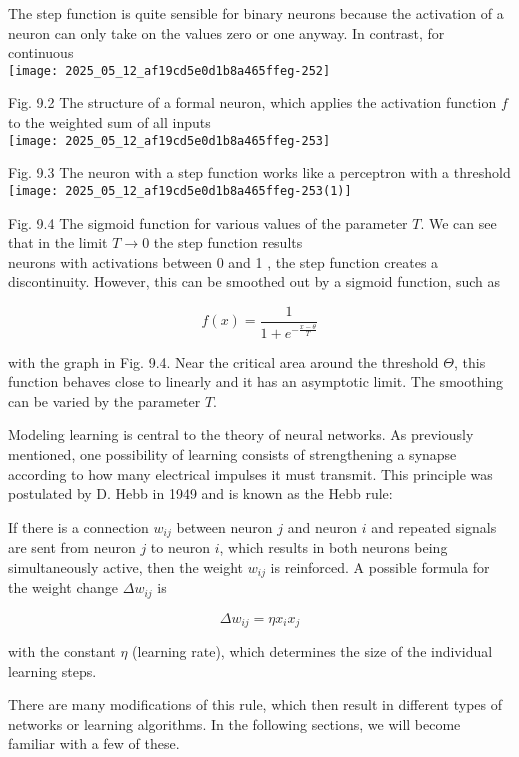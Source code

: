 \documentclass[10pt]{article}
\begin{document}
The step function is quite sensible for binary neurons because the activation of a neuron can only take on the values zero or one anyway. In contrast, for continuous\\
\texttt{[image: 2025\_05\_12\_af19cd5e0d1b8a465ffeg-252]}

Fig. 9.2 The structure of a formal neuron, which applies the activation function $f$ to the weighted sum of all inputs\\
\texttt{[image: 2025\_05\_12\_af19cd5e0d1b8a465ffeg-253]}

Fig. 9.3 The neuron with a step function works like a perceptron with a threshold\\
\texttt{[image: 2025\_05\_12\_af19cd5e0d1b8a465ffeg-253(1)]}

Fig. 9.4 The sigmoid function for various values of the parameter $T$. We can see that in the limit $T \rightarrow 0$ the step function results\\
neurons with activations between 0 and 1 , the step function creates a discontinuity. However, this can be smoothed out by a sigmoid function, such as

$$
f(x)=\frac{1}{1+e^{-\frac{x-\theta}{T}}}
$$

with the graph in Fig. 9.4. Near the critical area around the threshold $\Theta$, this function behaves close to linearly and it has an asymptotic limit. The smoothing can be varied by the parameter $T$.

Modeling learning is central to the theory of neural networks. As previously mentioned, one possibility of learning consists of strengthening a synapse according to how many electrical impulses it must transmit. This principle was postulated by D. Hebb in 1949 and is known as the Hebb rule:

If there is a connection $w_{i j}$ between neuron $j$ and neuron $i$ and repeated signals are sent from neuron $j$ to neuron $i$, which results in both neurons being simultaneously active, then the weight $w_{i j}$ is reinforced. A possible formula for the weight change $\Delta w_{i j}$ is

$$
\Delta w_{i j}=\eta x_{i} x_{j}
$$

with the constant $\eta$ (learning rate), which determines the size of the individual learning steps.

There are many modifications of this rule, which then result in different types of networks or learning algorithms. In the following sections, we will become familiar with a few of these.
\end{document}
